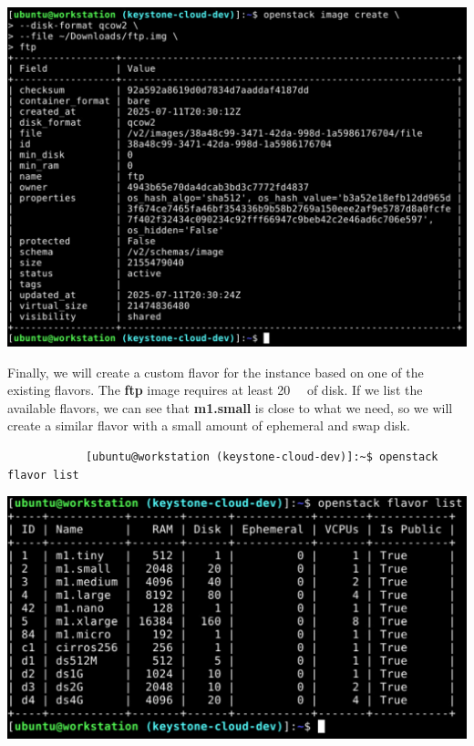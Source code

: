\documentclass[letterpaper, 12pt]{article}
\begin{document}
\begin{enumerate}
\begin{labstep}
        \begin{center}
            \includegraphics[width=\linewidth]{images/part1/step38.png}
        \end{center}
    \end{labstep}

    \begin{labstep}
        Finally, we will create a custom flavor for the instance based on one of the existing flavors.
        The \textbf{ftp} image requires at least \qty{20}{\giga\byte} of disk.
        If we list the available flavors, we can see that \textbf{m1.small} is close to what we need, so we will create a similar flavor with a small amount of ephemeral and swap disk.
        \begin{lstlisting}
            [ubuntu@workstation (keystone-cloud-dev)]:~$ openstack flavor list
        \end{lstlisting}

        \begin{center}
            \includegraphics[width=\linewidth]{images/part1/step39.png}
        \end{center}
    \end{labstep}


\end{enumerate}
\end{document}
